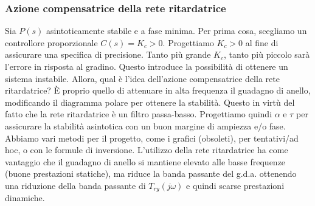 \documentclass[11pt]{article}
\begin{document}
\subsubsection{Azione compensatrice della rete ritardatrice}
Sia $P(s)$ asintoticamente stabile e a fase minima. Per prima cosa, scegliamo un controllore proporzionale $C(s)=K_c>0$. Progettiamo $K_c>0$ al fine di assicurare una specifica di precisione. Tanto più grande $K_c$, tanto più piccolo sarà l'errore in risposta al gradino. Questo introduce la possibilità di ottenere un sistema instabile. Allora, qual è l'idea dell'azione compensatrice della rete ritardatrice? È proprio quello di attenuare in alta frequenza il guadagno di anello, modificando il diagramma polare per ottenere la stabilità. Questo in virtù del fatto che la rete ritardatrice è un filtro passa-basso. Progettiamo quindi $\alpha$ e $\tau$ per assicurare la stabilità asintotica con un buon margine di ampiezza e/o fase. Abbiamo vari metodi per il progetto, come i grafici (obsoleti), per tentativi/ad hoc, o con le formule di inversione. L'utilizzo della rete ritardatrice ha come vantaggio che il guadagno di anello si mantiene elevato alle basse frequenze (buone prestazioni statiche), ma riduce la banda passante del g.d.a. ottenendo una riduzione della banda passante di $T_{ry}(j\omega)$ e quindi scarse prestazioni dinamiche.
\end{document}

